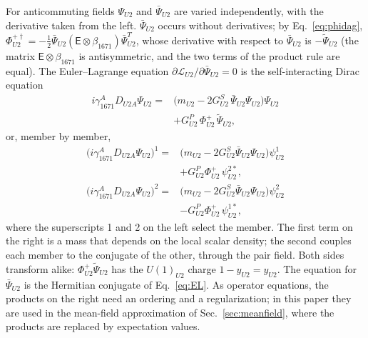 For anticommuting fields $\Psi_{U2}$ and $\bar\Psi_{U2}$ are varied independently, with the
derivative taken from the left. $\bar\Psi_{U2}$ occurs without derivatives; by
Eq.~\eqref{eq:phidag}, $\Phi^{+\dagger}_{U2}=-\tfrac12\bar\Psi_{U2}(\mathsf E\otimes\beta_{1671})
\bar\Psi^T_{U2}$, whose derivative with respect to $\bar\Psi_{U2}$ is $-\tilde\Psi_{U2}$ (the
matrix $\mathsf E\otimes\beta_{1671}$ is antisymmetric, and the two terms of the product rule are
equal). The Euler--Lagrange equation $\partial\mathcal L_{U2}/\partial\bar\Psi_{U2}=0$ is the
self-interacting Dirac equation
\begin{equation}
\begin{aligned}
i\gamma^A_{1671}D_{U2A}\Psi_{U2}={}&\big(m_{U2}-2G^S_{U2}\,\bar\Psi_{U2}\Psi_{U2}\big)\Psi_{U2}\\
&+G^P_{U2}\,\Phi^+_{U2}\,\tilde\Psi_{U2},
\end{aligned}
\label{eq:EL}
\end{equation}
or, member by member,
\begin{equation}
\begin{aligned}
\big(i\gamma^A_{1671}D_{U2A}\Psi_{U2}\big)^1={}&\big(m_{U2}-2G^S_{U2}\bar\Psi_{U2}\Psi_{U2}\big)\psi^1_{U2}\\
&+G^P_{U2}\Phi^+_{U2}\,\psi^{2*}_{U2},\\
\big(i\gamma^A_{1671}D_{U2A}\Psi_{U2}\big)^2={}&\big(m_{U2}-2G^S_{U2}\bar\Psi_{U2}\Psi_{U2}\big)\psi^2_{U2}\\
&-G^P_{U2}\Phi^+_{U2}\,\psi^{1*}_{U2},
\end{aligned}
\label{eq:ELcomp}
\end{equation}
where the superscripts 1 and 2 on the left select the member. The first term on the right is a
mass that depends on the local scalar density; the second couples each member to the conjugate
of the other, through the pair field. Both sides transform alike: $\Phi^+_{U2}\tilde\Psi_{U2}$ has
the $U(1)_{U2}$ charge $1-y_{U2}=y_{U2}$. The equation for $\bar\Psi_{U2}$ is the Hermitian
conjugate of Eq.~\eqref{eq:EL}. As operator equations, the products on the right need an
ordering and a regularization; in this paper they are used in the mean-field approximation of
Sec.~\ref{sec:meanfield}, where the products are replaced by expectation values.

